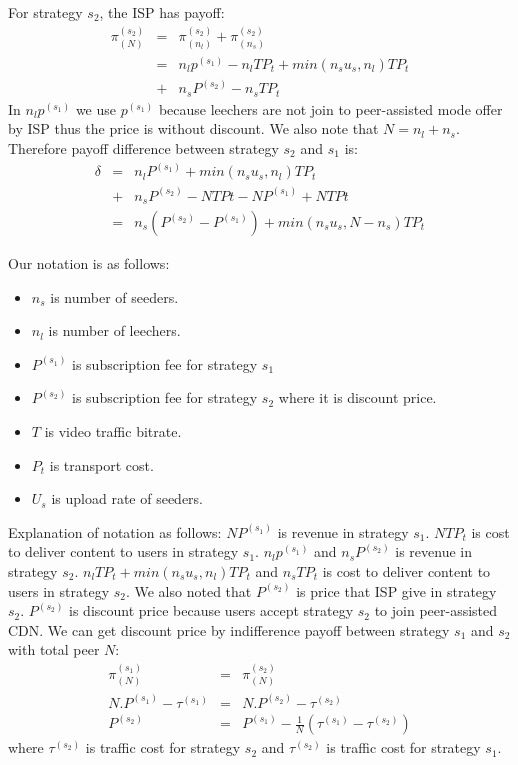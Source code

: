 \documentclass[paper]{ieice}
\begin{document}
For strategy $s_2$, the ISP has payoff:
\begin{eqnarray}
	\pi^{(s_2)}_{(N)} &=& \pi^{(s_2)}_{(n_l)} + \pi^{(s_2)}_{(n_s)}\\
	\nonumber &=&n_l p^{(s_1)} - n_l T P_t + min (n_s u_s,n_l)T P_t\\
	&+&n_s P^{(s_2)} - n_s T P_t
\end{eqnarray}
In $n_l p^{(s_1)}$ we use $p^{(s_1)}$ because leechers are not join to peer-assisted mode offer by ISP thus the price is without discount.
We also note that $N=n_l + n_s$.
Therefore payoff difference between strategy $s_2$ and $s_1$ is:
\begin{eqnarray}
	\delta &=& n_l P^{(s_1)} + min (n_s u_s,n_l)T P_t \\
	&+& n_s P^{(s_2)} - N T Pt - N P^{(s_1)} + N T Pt\\
	&=& n_s (P^{(s_2)} - P^{(s_1)}) + min(n_s u_s , N-n_s) T P_t
\end{eqnarray}

Our notation is as follows:
\begin{itemize}
	\item $n_s$ is number of seeders.
	\item $n_l$ is number of leechers.
	\item $P^{(s_1)}$ is subscription fee for strategy $s_1$
	\item $P^{(s_2)}$ is subscription fee for strategy $s_2$ where it is discount price.
	\item $T$ is video traffic bitrate. 
	\item $P_t$ is transport cost. 
	\item $U_s$ is upload rate of seeders.
\end{itemize}
Explanation of notation as follows:
$N P^{(s_1)}$ is revenue in strategy $s_1$.  
$N T P_t$ is cost to deliver content to users in strategy $s_1$.
$n_l p^{(s_1)}$ and $n_s P^{(s_2)}$ is revenue in strategy $s_2$.
$n_l T P_t + min (n_s u_s,n_l)T P_t$ and $n_s T P_t$ is cost to deliver content to users in strategy $s_2$.
We also noted that $P^{(s_2)}$ is price that ISP give in strategy $s_2$. 
$P^{(s_2)}$ is discount price because users accept strategy $s_2$ to join peer-assisted CDN.  
We can get discount price by indifference payoff between strategy $s_1$ and $s_2$ with total peer $N$:
\begin{eqnarray}  
	\pi^{(s_1)}_{(N)} &=& \pi^{(s_2)}_{(N)}\\
	N.P^{(s_1)} - \tau^{(s_1)} &=& N.P^{(s_2)} - \tau^{(s_2)}\\
	P^{(s_2)} &=& P^{(s_1)} - \frac{1}{N} (\tau^{(s_1)} -  \tau^{(s_2)} ) 
\end{eqnarray}
where $\tau^{(s_2)}$ is traffic cost for strategy $s_2$ and $\tau^{(s_2)}$ is traffic cost for strategy $s_1$.
\end{document}
